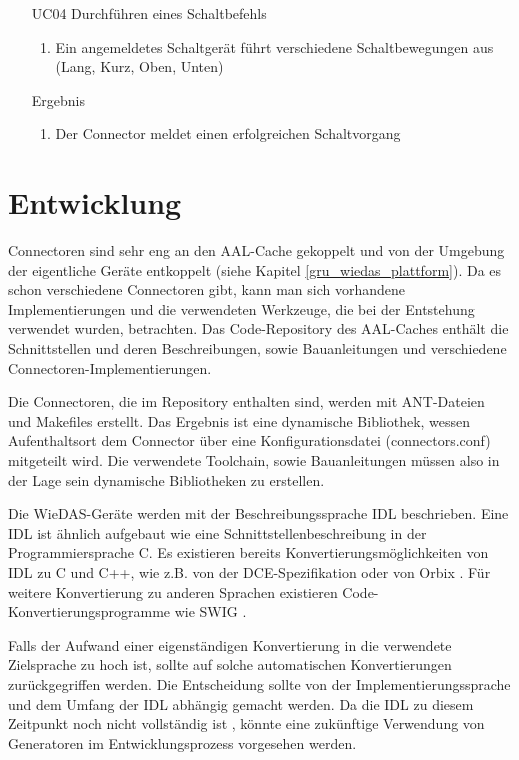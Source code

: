 \begin{itemize}
\item[UC04] Durchführen eines Schaltbefehls
 \begin{enumerate}
 \item Ein angemeldetes Schaltgerät führt verschiedene Schaltbewegungen aus (Lang, Kurz, Oben, Unten)
 \end{enumerate}
\item[Ergebnis]
 \begin{enumerate}
 \item Der Connector meldet einen erfolgreichen Schaltvorgang
 \end{enumerate}
\end{itemize}

\section{Entwicklung}
\label{ana_sw}

Connectoren sind sehr eng an den AAL-Cache gekoppelt und von der Umgebung der eigentliche Geräte
entkoppelt (siehe Kapitel \ref{gru_wiedas_plattform}).
Da es schon verschiedene Connectoren gibt, kann man sich vorhandene Implementierungen und die
verwendeten Werkzeuge, die bei der Entstehung verwendet wurden, betrachten.
Das Code-Repository des AAL-Caches enthält die Schnittstellen und deren Beschreibungen, sowie
Bauanleitungen und verschiedene Connectoren-Implementierungen.

Die Connectoren, die im Repository enthalten sind, werden mit ANT-Dateien und Makefiles erstellt.
Das Ergebnis ist eine dynamische Bibliothek, wessen Aufenthaltsort dem Connector über eine
Konfigurationsdatei (connectors.conf) mitgeteilt wird.
Die verwendete Toolchain, sowie Bauanleitungen müssen also in der Lage sein dynamische Bibliotheken
zu erstellen.

Die WieDAS-Geräte werden mit der Beschreibungssprache IDL beschrieben.
Eine IDL ist ähnlich aufgebaut wie eine Schnittstellenbeschreibung in der Programmiersprache C.
Es existieren bereits Konvertierungsmöglichkeiten von IDL zu C und C++, wie z.B. von der
DCE-Spezifikation \cite{cde} oder von Orbix \cite{orbix}.
Für weitere Konvertierung zu anderen Sprachen existieren Code-Konvertierungsprogramme wie SWIG \cite{swig}.

Falls der Aufwand einer eigenständigen Konvertierung in die verwendete Zielsprache zu hoch ist, sollte
auf solche automatischen Konvertierungen zurückgegriffen werden.
Die Entscheidung sollte von der Implementierungssprache und dem Umfang der IDL abhängig gemacht werden.
Da die IDL zu diesem Zeitpunkt noch nicht vollständig ist \cite{wiedas_onto},
könnte eine zukünftige Verwendung von Generatoren im Entwicklungsprozess vorgesehen werden.

